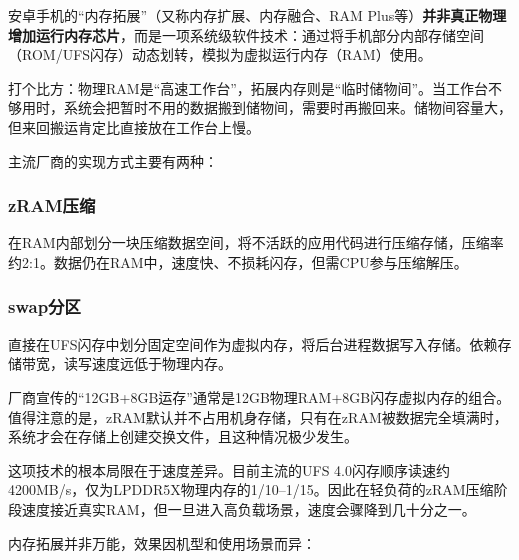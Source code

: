 


安卓手机的“内存拓展”（又称内存扩展、内存融合、RAM Plus等）\textbf{并非真正物理增加运行内存芯片}，而是一项系统级软件技术：通过将手机部分内部存储空间（ROM/UFS闪存）动态划转，模拟为虚拟运行内存（RAM）使用。

打个比方：物理RAM是“高速工作台”，拓展内存则是“临时储物间”。当工作台不够用时，系统会把暂时不用的数据搬到储物间，需要时再搬回来。储物间容量大，但来回搬运肯定比直接放在工作台上慢。


主流厂商的实现方式主要有两种：

\subsubsection*{zRAM压缩}

在RAM内部划分一块压缩数据空间，将不活跃的应用代码进行压缩存储，压缩率约2:1。数据仍在RAM中，速度快、不损耗闪存，但需CPU参与压缩解压。

\subsubsection*{swap分区}

直接在UFS闪存中划分固定空间作为虚拟内存，将后台进程数据写入存储。依赖存储带宽，读写速度远低于物理内存。

厂商宣传的“12GB+8GB运存”通常是12GB物理RAM+8GB闪存虚拟内存的组合。值得注意的是，zRAM默认并不占用机身存储，只有在zRAM被数据完全填满时，系统才会在存储上创建交换文件，且这种情况极少发生。


这项技术的根本局限在于速度差异。目前主流的UFS 4.0闪存顺序读速约4200MB/s，仅为LPDDR5X物理内存的1/10–1/15。因此在轻负荷的zRAM压缩阶段速度接近真实RAM，但一旦进入高负载场景，速度会骤降到几十分之一。


内存拓展并非万能，效果因机型和使用场景而异：

